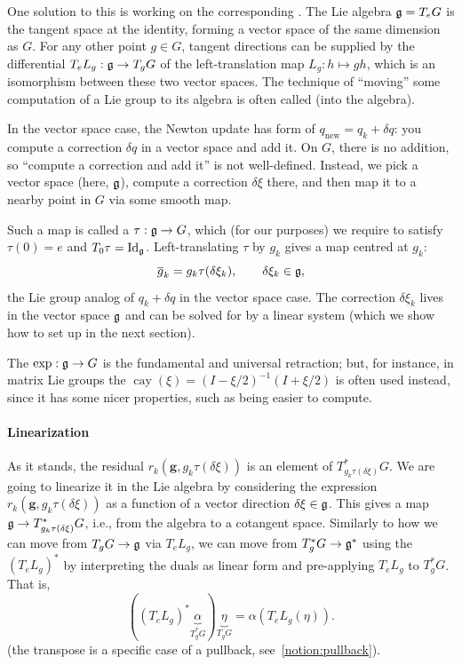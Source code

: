 One solution to this is working on the corresponding .
The Lie algebra ${\mathfrak{g}} = T_e G$ is the tangent space at the identity, forming a vector space of the same dimension as $G$.
For any other point $g \in G$, tangent directions can be supplied by the differential $T_e L_g : {\mathfrak{g}} \to T_g G$ of the left-translation map $L_g : h \mapsto gh$, which is an isomorphism between these two vector spaces. The technique of ``moving'' some computation of a Lie group to its algebra is often called  (into the algebra).

In the vector space case, the Newton update has form of $q_\textrm{new} = q_k + \delta q$: you compute a correction $\delta q$ in a vector space and add it. On $G$, there is no addition, so ``compute a correction and add it'' is not well-defined. Instead, we pick a vector space (here, ${\mathfrak{g}}$), compute a correction $\delta \xi$ there, and then map it to a nearby point in $G$ via some smooth map.

Such a map is called a  $\tau : {\mathfrak{g}} \to G$, which (for our purposes) we require to satisfy $\tau(0) = e$ and $T_0\tau = \mathrm{Id}_{\mathfrak{g}}$.
Left-translating $\tau$ by $g_k$ gives a map centred at $g_k$:
\begin{equation}
	\overline{g}_k = g_k\tau(\delta \xi_k), \qquad \delta \xi_k \in {\mathfrak{g}},
	\label{eq:lie-retraction}
\end{equation}
the Lie group analog of $q_k + \delta q$ in the vector space case.
The correction $\delta \xi_k$ lives in the vector space ${\mathfrak{g}}$ and can be solved for by a linear system (which we show how to set up in the next section).

\begin{remark}
	The  $\exp : {\mathfrak{g}} \to G$ is the fundamental and universal retraction; but, for instance, in matrix Lie groups the  $\operatorname{cay}(\xi) = (I - \xi/2)^{-1}(I + \xi/2)$ is often used instead, since it has some nicer properties, such as being easier to compute.
\end{remark}

\paragraph{Linearization}

As it stands, the residual $r_k(\mathbf{g}, g_k\tau(\delta\xi))$ is an element of $T_{g_k \tau(\delta \xi)}^*G$. We are going to linearize it in the Lie algebra by considering the expression $r_k(\mathbf{g}, g_k\tau(\delta\xi))$ as a function of a vector direction $\delta \xi \in {\mathfrak{g}}$. This gives a map ${\mathfrak{g}} \to T_{g_k \tau(\delta \xi)}^* G$, i.e., from the algebra to a cotangent space. Similarly to how we can move from $T_g G \to {\mathfrak{g}}$ via $T_e L_g$, we can move from $T_g^*G \to {\mathfrak{g}}^*$ using the  $(T_e L_g)^*$ by interpreting the duals as linear form and pre-applying $T_e L_g$ to $T_g^*G$. That is,
\[ ((T_e L_g)^* \underbrace{\alpha}_{T_g^* G}) \underbrace{\eta}_{T_g G} = \alpha(T_e L_g (\eta)). \]
(the transpose is a specific case of a pullback, see~\ref{notion:pullback}). %

